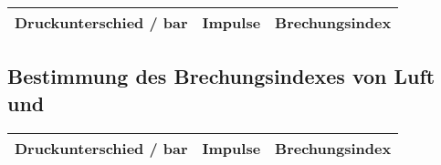 \begin{table}[h!]
	\centering	
	\begin{tabular}{ccc}
		Druckunterschied / \si{\bar} & Impulse & Brechungsindex \\
		\hline
		
	\end{tabular}
	\label{tab:BrechungsindexLuft}
\end{table}

\subsection{Bestimmung des Brechungsindexes von Luft und }
\begin{table}[h!]
	\centering
	\begin{tabular}{ccc}
		Druckunterschied / \si{\bar} & Impulse & Brechungsindex \\
		\hline
		
	\end{tabular}
	\label{tab:BrechungsindexCO2}
\end{table}









